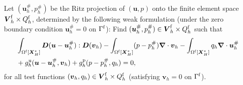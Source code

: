 \documentclass[11pt,reqno]{amsart}
\theoremstyle{definition}
\theoremstyle{plain}
\numberwithin{theorem}{section}
\numberwithin{proposition}{section}
\numberwithin{lemma}{section}
\numberwithin{equation}{section}
\newcommand{\bs}[1]{\boldsymbol{#1}}
\newcommand{\uu}[1]  {{\bs{#1}} }
\newcommand{\grad}   { \uu{\nabla}    }
\newcommand{\bv}{{\bs v}}
\def\b{\color{blue}}
\renewcommand{\(}{\bigl(}
\renewcommand{\)}{\bigr)}
\newcommand{\MO}[1]{{\color{magenta} MO:  #1}}
\begin{document}
Let $({\bs u}_h^\#,p_h^\#)$ be the Ritz projection of $({\bs u},p)$ onto the finite element space $ {\bs V}_h^{\rm f} \times Q_h^{\rm f}$, determined by the following weak formulation (under the zero boundary condition ${\bs u}_h^\#=0$ on $\Gamma^{\rm f}$): Find $({\bs u}_h^\#,p_h^\#)\in {\bs V}_h^{\rm f} \times Q_h^{\rm f}$ such that
\begin{align}\label{def-Ritz}
& \int_{\Omega^{\rm f}[\bs X_H^*]} \bs D({\bs u}-{\bs u}_h^\#): \bs D(\bv_h)  - \int_{\Omega^{\rm f}[\bs X_H^*]} ( p - p_h^\# ) \grad\cdot\bv_h - \int_{\Omega^{\rm f}[\bs X_H^*]}  q_h \grad\cdot {\bs u}_h^\# \notag\\
& + g_h^{\rm u} ({\bs u}-{\bs u}_h^\#,\bv_h ) 
+ g_h^{\rm p} (p - p_h^\#,q_h ) = 0 ,
\end{align}
for all test functions $({\bs v}_h,q_h)\in {\bs V}_h^{\rm f} \times Q_h^{\rm f}$ (satisfying ${\bs v}_h=0$ on $\Gamma^{\rm f}$).  
\end{document}
